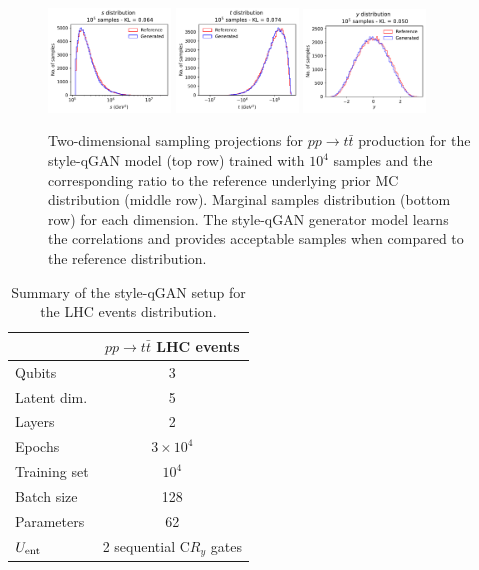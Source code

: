 \documentclass[twocolumn,preprintnumbers,superscriptaddress]{revtex4-2}
\begin{document}
\begin{figure}
  \includegraphics[width=0.29\textwidth]{plots/LHCttbar/s-distribution_LHCdata_100k.pdf}%
  \includegraphics[width=0.29\textwidth]{plots/LHCttbar/t-distribution_LHCdata_100k.pdf}%
  \includegraphics[width=0.29\textwidth]{plots/LHCttbar/y-distribution_LHCdata_100k.pdf}

  \caption{\label{fig:ttbar}Two-dimensional sampling projections for $pp
  \rightarrow t\bar{t}$ production for the style-qGAN model (top row) trained
  with $10^4$ samples and the corresponding ratio to the reference underlying
  prior MC distribution (middle row). Marginal samples distribution (bottom row)
  for each dimension. The style-qGAN generator model learns the correlations and
  provides acceptable samples when compared to the reference distribution.}
\end{figure}

\begin{table}
  \begin{tabular}{l|c}
     & {\bf $pp \rightarrow t\bar{t}$ LHC events} \tabularnewline
    \hline
    Qubits & 3  \tabularnewline
    Latent dim. & 5 \tabularnewline
    Layers & 2  \tabularnewline
    Epochs & $3\times10^4$ \tabularnewline
    Training set & $10^4$ \tabularnewline
    Batch size & 128 \tabularnewline
    Parameters & 62 \tabularnewline
    $U_{\rm ent}$ & 2 sequential C$R_y$ gates \tabularnewline
    \hline
  \end{tabular}

  \caption{\label{table:summary_lhc} Summary of the style-qGAN setup for the LHC events distribution.}
\end{table}
\end{document}
